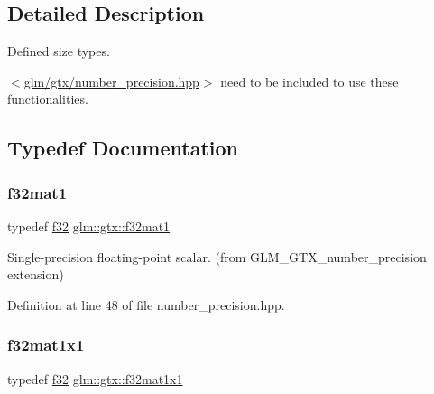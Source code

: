 \subsection{Detailed Description}
Defined size types. 

$<$\mbox{\hyperlink{number__precision_8hpp}{glm/gtx/number\+\_\+precision.\+hpp}}$>$ need to be included to use these functionalities. 

\subsection{Typedef Documentation}
\mbox{\label{group__gtx__number__precision_gae5ff376ec910c360f06acc0c2b99260c}} 
\subsubsection{\texorpdfstring{f32mat1}{f32mat1}}
{\footnotesize\ttfamily typedef \mbox{\hyperlink{group__gtc__type__precision_ga0ec999b57f5330d9021256e96038df04}{f32}} \mbox{\hyperlink{group__gtx__number__precision_gae5ff376ec910c360f06acc0c2b99260c}{glm\+::gtx\+::f32mat1}}}



Single-\/precision floating-\/point scalar. (from G\+L\+M\+\_\+\+G\+T\+X\+\_\+number\+\_\+precision extension) 



Definition at line 48 of file number\+\_\+precision.\+hpp.

\mbox{\label{group__gtx__number__precision_ga01caec78388a82a9a22bd45e5751a38a}} 
\subsubsection{\texorpdfstring{f32mat1x1}{f32mat1x1}}
{\footnotesize\ttfamily typedef \mbox{\hyperlink{group__gtc__type__precision_ga0ec999b57f5330d9021256e96038df04}{f32}} \mbox{\hyperlink{group__gtx__number__precision_ga01caec78388a82a9a22bd45e5751a38a}{glm\+::gtx\+::f32mat1x1}}}



